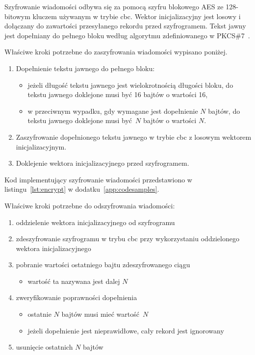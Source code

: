 Szyfrowanie wiadomości odbywa się za pomocą szyfru blokowego AES ze 128-bitowym kluczem używanym w trybie \gls{cbc}. Wektor inicjalizacyjny jest losowy i dołączany do zawartości przesyłanego rekordu przed szyfrogramem. Tekst jawny jest dopełniany do pełnego bloku według algorytmu zdefiniowanego w PKCS\#7~\cite{kaliski1998pkcs}.

Właściwe kroki potrzebne do zaszyfrowania wiadomości wypisano poniżej.

\begin{enumerate}
\item Dopełnienie tekstu jawnego do pełnego bloku:
\begin{itemize}
\item jeżeli długość tekstu jawnego jest wielokrotnością długości bloku, do tekstu jawnego doklejone musi być 16 bajtów o wartości 16,
\item w przeciwnym wypadku, gdy wymagane jest dopełnienie $ N $ bajtów, do tekstu jawnego doklejone musi być $ N $ bajtów o wartości $ N $.
\end{itemize}
\item Zaszyfrowanie dopełnionego tekstu jawnego w trybie \gls{cbc} z losowym wektorem inicjalizacyjnym.
\item Doklejenie wektora inicjalizacyjnego przed szyfrogramem.
\end{enumerate}

Kod implementujący szyfrowanie wiadomości przedstawiono w listingu~\ref{lst:encrypt} w dodatku~\ref{app:codesamples}.

Właściwe kroki potrzebne do odszyfrowania wiadomości:

\begin{enumerate}
\item oddzielenie wektora inicjalizacyjnego od szyfrogramu
\item zdeszyfrowanie szyfrogramu w trybu \gls{cbc} przy wykorzystaniu oddzielonego wektora inicjalizacyjnego
\item pobranie wartości ostatniego bajtu zdeszyfrowanego ciągu
\begin{itemize}
    \item wartość ta nazywana jest dalej $ N $
\end{itemize}
\item zweryfikowanie poprawności dopełnienia
\begin{itemize}
\item ostatnie $ N $ bajtów musi mieć wartość $ N $
\item jeżeli dopełnienie jest nieprawidłowe, cały rekord jest ignorowany
\end{itemize}
\item usunięcie ostatnich $ N $ bajtów
\end{enumerate}

